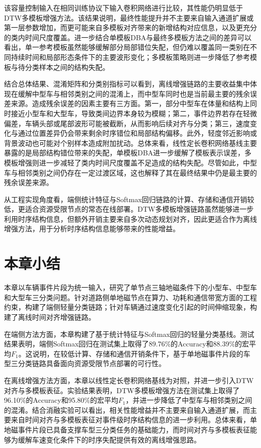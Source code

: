 \documentclass{xdupgthesis}
\begin{document}
该容量控制输入在相同训练协议下输入卷积网络进行比较，其性能仍明显低于DTW多模板增强方法。该结果说明，最终性能提升并不主要来自输入通道扩展或第一层参数增加，而更可能来自多模板对齐带来的新增结构对应信息，以及更充分的类内时间尺度覆盖。进一步结合单模板DBA与最终多模板方法之间的差异可以看出，单一参考模板虽然能够缓解部分局部错位失配，但仍难以覆盖同一类别在不同持续时间和局部形态条件下的主要波形变化；多模板策略则进一步降低了参考模板与待分类样本之间的结构失配。

结合总体结果、混淆矩阵和分类别指标可以看到，离线增强链路的主要收益集中体现在缓解中型车与相邻类别之间的混淆上，而中型车同时也是当前最主要的残余误差来源。造成残余误差的因素主要有三方面。第一，部分中型车在体量和结构上同时接近小型车和大型车，导致类间边界本身较为模糊；第二，事件边界若存在轻微偏差，车辆头部或尾部波形可能被截断，从而影响后续对齐与分类；第三，速度变化与通过位置差异仍会带来剩余时序错位和局部结构偏移。此外，轻度邻近影响或背景波动也可能对个别样本造成附加扰动。总体来看，线性定长卷积网络基线主要暴露的是局部结构错位带来的失配，单模板DBA进一步缓解了模板表示误差，多模板增强则进一步减轻了类内时间尺度覆盖不足造成的结构失配。尽管如此，中型车与相邻类别之间仍存在一定过渡区域，这也解释了其在最终结果中仍是最主要的残余误差来源。

从工程实现角度看，端侧统计特征与Softmax回归链路的计算、存储和通信开销较低，更适合资源受限节点的常态在线部署。DTW多模板增强链路虽然能够进一步利用时序结构信息，但额外开销主要来自多次动态规划对齐，因此更适合作为离线增强方法，用于分析时序结构信息能够带来的性能增益。


\section{本章小结}
\label{sec:ch3_summary}

本章以车辆事件片段为统一输入，研究了单节点三轴地磁条件下的小型车、中型车和大型车三分类问题。针对道路侧单地磁节点在算力、功耗和通信带宽方面的工程约束，构建了端侧轻量分类链路；针对车辆通过速度变化引起的时间伸缩现象，构建了离线时间对齐增强链路。

在端侧方法方面，本章构建了基于统计特征与Softmax回归的轻量分类基线。测试结果表明，端侧Softmax回归在测试集上取得了89.76\%的Accuracy和88.39\%的宏平均$F_1$。这说明，在较低计算、存储和通信开销条件下，基于单地磁事件片段的车型三分类链路具备面向资源受限节点部署的可行性。

在离线增强方法方面，本章以线性定长卷积网络基线为对照，并进一步引入DTW对齐与多模板表征。实验结果表明，DTW多模板增强方法在测试集上取得了96.10\%的Accuracy和95.80\%的宏平均$F_1$，并进一步降低了中型车与相邻类别之间的混淆。结合消融实验可以看出，相关性能增益并不主要来自输入通道扩展，而主要来自时间对齐与多模板表征对事件级时序结构信息的进一步利用。总体来看，单地磁事件片段已具备支撑车型三分类任务的基础能力，而时间对齐与多模板表征能够为缓解车速变化条件下的时序失配提供有效的离线增强思路。
\end{document}
